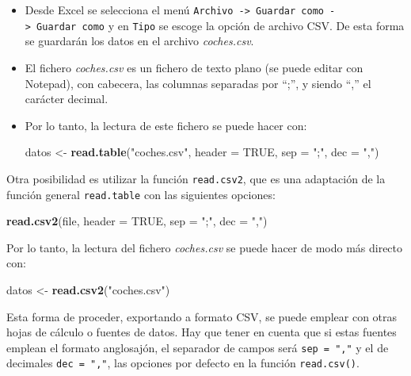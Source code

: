 \documentclass[]{book}
\newenvironment{Shaded}{\begin{snugshade}}{\end{snugshade}}
\newcommand{\KeywordTok}[1]{\textcolor[rgb]{0.13,0.29,0.53}{\textbf{#1}}}
\newcommand{\DataTypeTok}[1]{\textcolor[rgb]{0.13,0.29,0.53}{#1}}
\newcommand{\StringTok}[1]{\textcolor[rgb]{0.31,0.60,0.02}{#1}}
\newcommand{\OtherTok}[1]{\textcolor[rgb]{0.56,0.35,0.01}{#1}}
\newcommand{\NormalTok}[1]{#1}
\begin{document}
\begin{itemize}
\item
  Desde Excel se selecciona el menú
  \texttt{Archivo\ -\textgreater{}\ Guardar\ como\ -\textgreater{}\ Guardar\ como}
  y en \texttt{Tipo} se escoge la opción de archivo CSV. De esta forma
  se guardarán los datos en el archivo \emph{coches.csv}.
\item
  El fichero \emph{coches.csv} es un fichero de texto plano (se puede
  editar con Notepad), con cabecera, las columnas separadas por ``;'', y
  siendo ``,'' el carácter decimal.
\item
  Por lo tanto, la lectura de este fichero se puede hacer con:

\begin{Shaded}
\begin{Highlighting}[]
\NormalTok{datos <-}\StringTok{ }\KeywordTok{read.table}\NormalTok{(}\StringTok{"coches.csv"}\NormalTok{, }\DataTypeTok{header =} \OtherTok{TRUE}\NormalTok{, }\DataTypeTok{sep =} \StringTok{";"}\NormalTok{, }\DataTypeTok{dec =} \StringTok{","}\NormalTok{)}
\end{Highlighting}
\end{Shaded}
\end{itemize}

Otra posibilidad es utilizar la función \texttt{read.csv2}, que es una
adaptación de la función general \texttt{read.table} con las siguientes
opciones:

\begin{Shaded}
\begin{Highlighting}[]
\KeywordTok{read.csv2}\NormalTok{(file, }\DataTypeTok{header =} \OtherTok{TRUE}\NormalTok{, }\DataTypeTok{sep =} \StringTok{";"}\NormalTok{, }\DataTypeTok{dec =} \StringTok{","}\NormalTok{)}
\end{Highlighting}
\end{Shaded}

Por lo tanto, la lectura del fichero \emph{coches.csv} se puede hacer de
modo más directo con:

\begin{Shaded}
\begin{Highlighting}[]
\NormalTok{datos <-}\StringTok{ }\KeywordTok{read.csv2}\NormalTok{(}\StringTok{"coches.csv"}\NormalTok{)}
\end{Highlighting}
\end{Shaded}

Esta forma de proceder, exportando a formato CSV, se puede emplear con
otras hojas de cálculo o fuentes de datos. Hay que tener en cuenta que
si estas fuentes emplean el formato anglosajón, el separador de campos
será \texttt{sep\ =\ ","} y el de decimales \texttt{dec\ =\ ","}, las
opciones por defecto en la función \texttt{read.csv()}.
\end{document}
